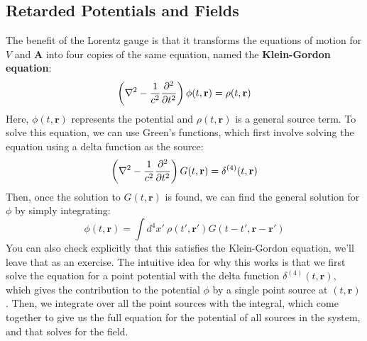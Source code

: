 \subsection{Retarded Potentials and Fields} 
The benefit of the Lorentz gauge is that it transforms the equations of motion for \( V \) and \( \mathbf{A}
\) into four copies of the same equation, named the \textbf{Klein-Gordon equation}:
\[
	\left( \nabla^2 - \frac{1}{c^2} \pdv[2]{t}\right)\phi(t, \mathbf{r}) = \rho(t, \mathbf{r})
\]
Here, \( \phi(t, \mathbf{r}) \) represents the potential and \( \rho(t, \mathbf{r}) \) is a general source
term. To solve this equation, we can use Green's functions, which first involve solving the equation using a
delta function as the source:
\[
	\left( \nabla^2 - \frac{1}{c^2}\pdv[2]{t} \right)G(t, \mathbf{r}) = \delta^{(4)}(t, \mathbf{r})
\]
Then, once the solution to \( G(t, \mathbf{r}) \) is found, we can find the general solution for \( \phi \)
by simply integrating:
\begin{equation}
	\label{19:potential}
	\phi(t, \mathbf{r}) = \int d^{4}x'\ \rho(t', \mathbf{r}') G(t - t', \mathbf{r} - \mathbf{r}')
\end{equation}
You can also check explicitly that this satisfies the Klein-Gordon equation, we'll leave that as an exercise.
The intuitive idea for why this works is that we first solve the equation for a point potential with the delta
function \( \delta^{(4)}(t, \mathbf{r}) \), which gives the contribution to the potential \( \phi \) by a
single point source at \( (t, \mathbf{r}) \). Then, we integrate over all the point sources with the
integral, which come together to give us the full equation for the potential of all sources in the system,
and that solves for the field. 

